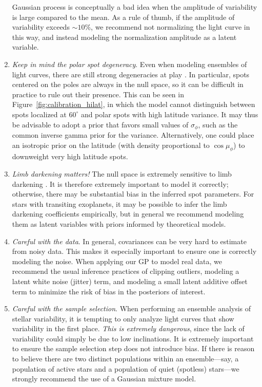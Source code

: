 \documentclass[modern,linenumbers]{aastex62}
\begin{document}
\begin{enumerate}
          Gaussian process is conceptually a bad idea when the amplitude
          of variability is large compared to the mean. As a rule of thumb, if
          the amplitude of variability exceeds $\sim 10\%$, we recommend
          not normalizing the light curve in this way, and instead modeling
          the normalization amplitude as a latent variable.
    \item \emph{Keep in mind the polar spot degeneracy}. Even when modeling
          ensembles of light curves, there are still strong degeneracies at
          play . In particular, spots centered on the poles are always in
          the null space, so it can be difficult in practice to rule out
          their presence. This can be seen in Figure~\ref{fig:calibration_hilat},
          in which the model cannot distinguish between spots localized
          at $60^\circ$ and polar spots with high latitude variance.
          It may thus be advisable to adopt a prior that favors small values
          of $\sigma_\phi$, such as the common inverse gamma prior for the
          variance. Alternatively, one could place an isotropic prior on
          the latitude (with density proportional to $\cos\mu_\phi$)
          to downweight very high latitude spots.
    \item \emph{Limb darkening matters!} The null space is extremely sensitive
          to limb darkening . It is therefore
          extremely important to model it correctly; otherwise, there may
          be substantial bias in the inferred spot parameters. For stars with
          transiting exoplanets, it may be possible to infer the limb darkening
          coefficients empirically, but in general we recommend modeling them
          as latent variables with priors informed by theoretical models.
    \item \emph{Careful with the data}. In general, covariances can be very
          hard to estimate from noisy data. This makes it especially important
          to ensure one is correctly modeling the noise. When applying our GP
          to model real data, we recommend the usual
          inference practices of clipping outliers,
          modeling a latent white noise (jitter) term, and modeling
          a small latent additive offset term to minimize the risk of
          bias in the posteriors of interest.
    \item \emph{Careful with the sample selection}. When performing an ensemble
          analysis of stellar variability, it is tempting to only analyze light curves
          that show variability in the first place. \emph{This is extremely
              dangerous}, since the lack of variability could simply be due to low
          inclinations. It is extremely important to ensure the sample selection step does
          not introduce bias. If there is reason to believe there are two
          distinct populations within an ensemble---say, a population of active
          stars and a population of quiet (spotless) stars---we strongly recommend
          the use of a Gaussian mixture model.
\end{enumerate}
\end{document}
